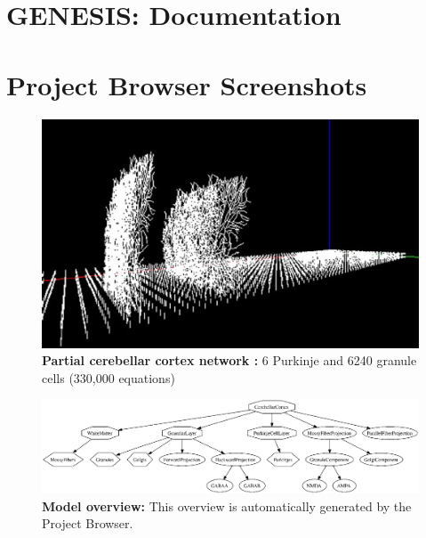 \documentclass[12pt]{article}
\begin{document}
\section*{GENESIS: Documentation}

\section*{Project Browser Screenshots}

\begin{figure}[h]
  \centering
 \includegraphics[scale=0.6]{figures/screenshot-1.eps}
\caption{{\bf Partial cerebellar cortex network :} 6 Purkinje and 6240 granule cells (330,000 equations)}
  \label{fig:pb-1}
\end{figure}

\begin{figure}[h]
  \centering
 \includegraphics[scale=0.3]{figures/screenshot-2.eps}
 \caption{{\bf Model overview:} This overview is automatically generated by the Project Browser.}
  \label{fig:pb-2}
\end{figure}
\end{document}
